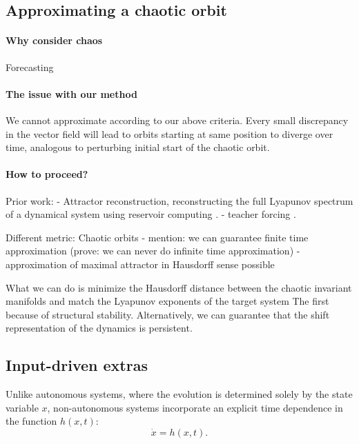 \documentclass{article}
\theoremstyle{definition} \newtheorem{definition}{Definition}
\theoremstyle{remark} \newtheorem{remark}{Remark}
\newcounter{ct}
\begin{document}
\subsection{Approximating a chaotic orbit}\label{sec:chaos} 
\citep{pathak2017using}
\paragraph{Why consider chaos} 
Forecasting
\citep{jaeger2004harnessing}
\citep{fan2020long}
\citep{vlachas2020backpropagation}
\citep{grigoryeva2024forecasting}

\paragraph{The issue with our method} 
We cannot approximate according to our above criteria.
Every small discrepancy in the vector field will lead to orbits starting at same position to diverge over time, analogous to perturbing initial start of the chaotic orbit.


\paragraph{How to proceed?}
Prior work:
- Attractor reconstruction, reconstructing the full Lyapunov spectrum of a dynamical system using reservoir computing \citep{hart2024attractor}.
- teacher forcing \citep{hess2023teacherforcing}.

Different metric: Chaotic orbits
- mention: we can guarantee finite time approximation (prove: we can never do infinite time approximation)
- approximation of maximal attractor in Hausdorff sense possible \citep{hess2023teacherforcing}

What we can do is minimize the Hausdorff distance between the chaotic invariant manifolds and match the Lyapunov exponents of the target system
The first because of structural stability.
%
Alternatively, we can guarantee that the shift representation of the dynamics is persistent.



\subsection{Input-driven extras}\label{sec:input_driven_app} 
Unlike autonomous systems, where the evolution is determined solely by the state variable $x$, non-autonomous systems incorporate an explicit time dependence in the function $h(x,t)$:
\begin{equation}
\dot x = h(x,t).
\end{equation}
\end{document}
